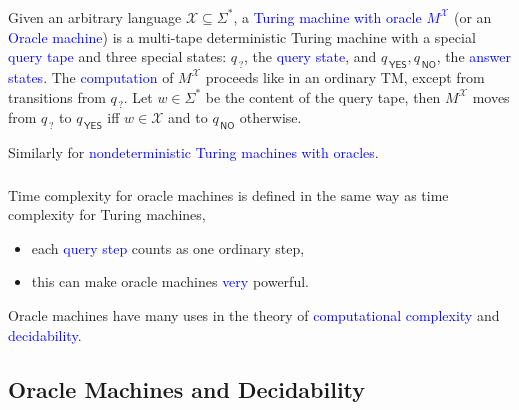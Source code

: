 \documentclass{beamer}
\newcommand{\X}{\mathcal{X}}
\newcommand{\qquest}{q_{\,?}}
\newcommand{\qyes}{q_{\,\mathsf{YES}}}
\newcommand{\qno}{q_{\,\mathsf{NO}}}
\newcommand{\hlbl}[1]{\textcolor{blue}{#1}}
\begin{document}
\begin{frame}
  \frametitle{\insertsection}
  \begin{definition}
    Given an arbitrary language $\X \subseteq \Sigma^{*}$, a \hlbl{Turing
    machine with oracle $M^{\X}$} (or an \hlbl{Oracle machine}) is a multi-tape
    deterministic Turing machine with a special \hlbl{query tape} and three
    special states: $\qquest$, the \hlbl{query state}, and $\qyes, \qno$, the
    \hlbl{answer states}.
    The \hlbl{computation} of $M^{\X}$ proceeds like in an ordinary TM,
    except from transitions from $\qquest$.
    Let $w \in \Sigma^{*}$ be the content of the query tape, then
    $M^{\X}$ moves from $\qquest$ to $\qyes$ iff $w \in \X$ and to $\qno$
    otherwise.
  \end{definition}

  \vspace{3mm}
  Similarly for \hlbl{nondeterministic Turing machines with oracles}.


\end{frame}

\begin{frame}
  \frametitle{\insertsection}
  Time complexity for oracle machines is defined in the same way as time
  complexity for Turing machines,
  \begin{itemize}
    \item  each \hlbl{query step} counts as one ordinary step,
    \item  this can make oracle machines \hlbl{very} powerful.
  \end{itemize}

  \vspace{3mm}
  Oracle machines have many uses in the theory of \hlbl{computational
  complexity} and \hlbl{decidability}.
\end{frame}

\subsection{Oracle Machines and Decidability}\label{}
\end{document}
